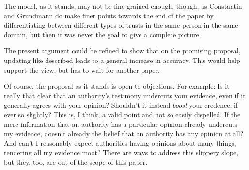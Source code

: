 \documentclass[11pt, a4paper]{scrartcl}
\renewcommand{\i}[1]{\emph{#1}}
\begin{document}
The model, as it stands, may not be fine grained enough, though, as Constantin and Grundmann do make finer points towards the end of the paper by differentiating between different types of trusts in the same person in the same domain, but then it was never the goal to give a complete picture. 

The present argument could be refined to show that on the promising proposal, updating like described leads to a general increase in accuracy. This would help support the view, but has to wait for another paper.

Of course, the proposal as it stands is open to objections. For example: Is it really that clear that an authority's testimony undercuts your evidence, even if it generally agrees with your opinion? Shouldn't it instead \i{boost} your credence, if ever so slightly? This is, I think, a valid point and not so easily dispelled. 
If the mere information that an authority has a particular opinion already undercuts my evidence, doesn't already the belief that an authority has any opinion at all? And can't I reasonably expect authorities having opinions about many things, rendering all my evidence moot? There are ways to address this slippery slope, but they, too, are out of the scope of this paper.

\printbibliography{}
\end{document}
